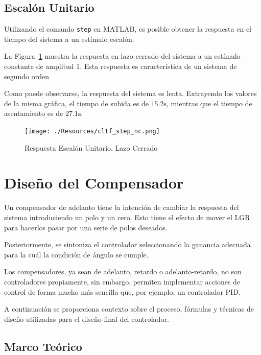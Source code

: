 \documentclass[12pt,a4paper]{article}
\begin{document}
    \subsection{Escalón Unitario}
      
      Utilizando el comando \verb|step| en MATLAB, es posible obtener la respuesta en el tiempo del sistema 
      a un estímulo escalón.   

      La Figura~\ref{fig:response:closedLoopStep} muestra la respuesta en lazo cerrado del sistema a un 
      estímulo constante de amplitud 1. Esta respuesta es característica de un sistema de segundo orden

      Como puede observarse, la respuesta del sistema es lenta. Extrayendo los valores de la misma gráfica, 
      el tiempo de subida es de \(15.2\si{\second}\), mientras que el tiempo de asentamiento es 
      de \(27.1\si{\second}\).

      \begin{figure}
        \centering
        \texttt{[image: ./Resources/cltf\_step\_nc.png]}
        \caption{Respuesta Escalón Unitario, Lazo Cerrado}
        \label{fig:response:closedLoopStep}
      \end{figure}

  \pagebreak

  \section{Diseño del Compensador}

      Un compensador de adelanto tiene la intención de cambiar la respuesta del sistema introduciendo un polo y un cero. Esto 
      tiene el efecto de mover el LGR para hacerlos pasar por una serie de polos deseados. 

      Posteriormente, se sintoniza el controlador seleccionando la ganancia adecuada para la cuál la condición de ángulo 
      se cumple. 

      Los compensadores, ya sean de adelanto, retardo o adelanto-retardo, no son controladores propiamente, sin embargo, permiten
      implementar acciones de control de forma mucho más sencilla que, por ejemplo, un controlador PID. 

      A continuación se proporciona contexto sobre el proceso, fórmulas y técnicas de diseño utilizadas para 
      el diseño final del controlador.

      \subsection{Marco Teórico}
\end{document}
